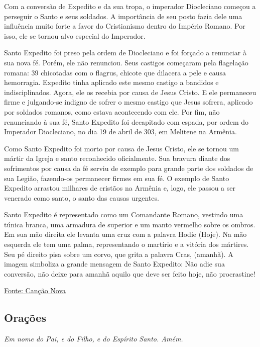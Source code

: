 \documentclass[18pt]{article}
\begin{document}
\begin{justify}
Com a conversão de Expedito e da sua tropa, o imperador Diocleciano começou a perseguir o Santo e seus soldados. A importância de seu posto fazia dele uma influência muito forte a favor do Cristianismo dentro do Império Romano. Por isso, ele se tornou alvo especial do Imperador.

Santo Expedito foi preso pela ordem de Diocleciano e foi forçado a renunciar à sua nova fé. Porém, ele não renunciou. Seus castigos começaram pela flagelação romana: 39 chicotadas com o flagrus, chicote que dilacera a pele e causa hemorragia. Expedito tinha aplicado este mesmo castigo a bandidos e indisciplinados. Agora, ele os recebia por causa de Jesus Cristo. E ele permaneceu firme e julgando-se indigno de sofrer o mesmo castigo que Jesus sofrera, aplicado por soldados romanos, como estava acontecendo com ele. Por fim, não renunciando à sua fé, Santo Expedito foi decapitado com espada, por ordem do Imperador Diocleciano, no dia 19 de abril de 303, em Melitene na Armênia.

Como Santo Expedito foi morto por causa de Jesus Cristo, ele se tornou um mártir da Igreja e santo reconhecido oficialmente. Sua bravura diante dos sofrimentos por causa da fé serviu de exemplo para grande parte dos soldados de sua Legião, fazendo-os permanecer firmes em sua fé. O exemplo de Santo Expedito arrastou milhares de cristãos na Armênia e, logo, ele passou a ser venerado como santo, o santo das causas urgentes.

Santo Expedito é representado como um Comandante Romano, vestindo uma túnica branca, uma armadura de superior e um manto vermelho sobre os ombros. Em sua mão direita ele levanta uma cruz com a palavra Hodie (Hoje). Na mão esquerda ele tem uma palma, representando o martírio e a vitória dos mártires. Seu pé direito pisa sobre um corvo, que grita a palavra Cras, (amanhã). A imagem simboliza a grande mensagem de Santo Expedito: Não adie sua conversão, não deixe para amanhã aquilo que deve ser feito hoje, não procrastine!

\vfill

\begin{center}
 \href{https://santo.cancaonova.com/santo/santas-perpetua-e-felicidade/}{Fonte: Canção Nova}
\end{center}


\newpage
\begin{center}
 \section{Orações}\label{sec:Orações} %
\textit{Em nome do Pai, e do Filho, e do Espírito Santo. Amém.}
\end{center}


\end{justify}
\end{document}
